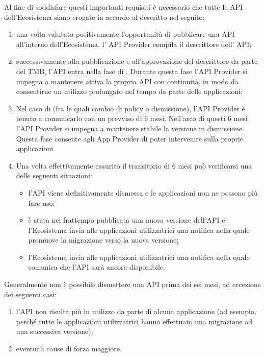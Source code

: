 \documentclass[letterpaper,10pt,italian]{sphinxmanual}
\begin{document}
Al fine di soddisfare questi importanti requisiti è necessario che tutte le API dell’Ecosistema siano erogate in accordo al  descritto nel seguito:
\begin{enumerate}
\item {} 
una volta valutata positivamente l’opportunità di pubblicare una API all’interno dell’Ecosistema, l’ API Provider compila il descrittore dell’ API;

\item {} 
successivamente alla pubblicazione e all’approvazione del descrittore da parte del TMB, l’API entra nella fase di . Durante questa fase l’API Provider si impegna a mantenere attiva la propria API con continuità, in modo da consentirne un utilizzo prolungato nel tempo da parte delle applicazioni;

\item {} 
Nel caso di  (fra le quali cambio di policy o dismissione), l’API Provider è tenuto a comunicarlo con un prevviso di 6 mesi. Nell’arco di questi 6 mesi l’API Provider si impegna a mantenere stabile la versione in dismissione. Questa fase consente agli App Provider di poter intervenire sulla proprie applicazioni

\item {} 
Una volta effettivamente esaurito il transitorio di 6 mesi può verificarsi una delle seguenti situazioni:
\begin{itemize}
\item {} 
l’API viene definitivamente dismessa e le applicazioni non ne possono più fare uso;

\item {} 
è stata nel frattempo pubblicata una nuova versione dell’API e l’Ecosistema invia alle applicazioni utilizzatrici una notifica nella quale promuove la migrazione verso la nuova versione;

\item {} 
l’Ecosistema invia alle applicazioni utilizzatrici una notifica nella quale comunica che l’API sarà ancora disponibile.

\end{itemize}

\end{enumerate}

Generalmente non è possibile dismettere una API prima dei sei mesi, ad eccezione dei seguenti casi:
\begin{enumerate}
\item {} 
l’API non risulta più in utilizzo da parte di alcuna applicazione (ad esempio, perché tutte le applicazioni utilizzatrici hanno effettuato una migrazione ad una successiva versione);

\item {} 
eventuali cause di forza maggiore.

\end{enumerate}
\end{document}

